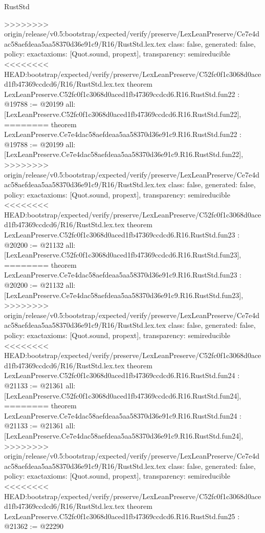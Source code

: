 \begin{lexlean}{RustStd}
\begin{coremodule}
{\begin{coremodule}
{{{{{{{{{{{{{{{{{{{{{{{{{>>>>>>>> origin/release/v0.5:bootstrap/expected/verify/preserve/LexLeanPreserve/Ce7e4dac58aefdeaa5aa58370d36e91c9/R16/RustStd.lex.tex
  class: false,
  generated: false,
  policy: exact{axioms: [Quot.sound, propext]},
  transparency: semireducible
}
<<<<<<<< HEAD:bootstrap/expected/verify/preserve/LexLeanPreserve/C52fc0f1c3068d0aced1fb47369ccdcd6/R16/RustStd.lex.tex
theorem LexLeanPreserve.C52fc0f1c3068d0aced1fb47369ccdcd6.R16.RustStd.fun22 : @19788 := @20199 {
  all: [LexLeanPreserve.C52fc0f1c3068d0aced1fb47369ccdcd6.R16.RustStd.fun22],
========
theorem LexLeanPreserve.Ce7e4dac58aefdeaa5aa58370d36e91c9.R16.RustStd.fun22 : @19788 := @20199 {
  all: [LexLeanPreserve.Ce7e4dac58aefdeaa5aa58370d36e91c9.R16.RustStd.fun22],
>>>>>>>> origin/release/v0.5:bootstrap/expected/verify/preserve/LexLeanPreserve/Ce7e4dac58aefdeaa5aa58370d36e91c9/R16/RustStd.lex.tex
  class: false,
  generated: false,
  policy: exact{axioms: [Quot.sound, propext]},
  transparency: semireducible
}
<<<<<<<< HEAD:bootstrap/expected/verify/preserve/LexLeanPreserve/C52fc0f1c3068d0aced1fb47369ccdcd6/R16/RustStd.lex.tex
theorem LexLeanPreserve.C52fc0f1c3068d0aced1fb47369ccdcd6.R16.RustStd.fun23 : @20200 := @21132 {
  all: [LexLeanPreserve.C52fc0f1c3068d0aced1fb47369ccdcd6.R16.RustStd.fun23],
========
theorem LexLeanPreserve.Ce7e4dac58aefdeaa5aa58370d36e91c9.R16.RustStd.fun23 : @20200 := @21132 {
  all: [LexLeanPreserve.Ce7e4dac58aefdeaa5aa58370d36e91c9.R16.RustStd.fun23],
>>>>>>>> origin/release/v0.5:bootstrap/expected/verify/preserve/LexLeanPreserve/Ce7e4dac58aefdeaa5aa58370d36e91c9/R16/RustStd.lex.tex
  class: false,
  generated: false,
  policy: exact{axioms: [Quot.sound, propext]},
  transparency: semireducible
}
<<<<<<<< HEAD:bootstrap/expected/verify/preserve/LexLeanPreserve/C52fc0f1c3068d0aced1fb47369ccdcd6/R16/RustStd.lex.tex
theorem LexLeanPreserve.C52fc0f1c3068d0aced1fb47369ccdcd6.R16.RustStd.fun24 : @21133 := @21361 {
  all: [LexLeanPreserve.C52fc0f1c3068d0aced1fb47369ccdcd6.R16.RustStd.fun24],
========
theorem LexLeanPreserve.Ce7e4dac58aefdeaa5aa58370d36e91c9.R16.RustStd.fun24 : @21133 := @21361 {
  all: [LexLeanPreserve.Ce7e4dac58aefdeaa5aa58370d36e91c9.R16.RustStd.fun24],
>>>>>>>> origin/release/v0.5:bootstrap/expected/verify/preserve/LexLeanPreserve/Ce7e4dac58aefdeaa5aa58370d36e91c9/R16/RustStd.lex.tex
  class: false,
  generated: false,
  policy: exact{axioms: [Quot.sound, propext]},
  transparency: semireducible
}
<<<<<<<< HEAD:bootstrap/expected/verify/preserve/LexLeanPreserve/C52fc0f1c3068d0aced1fb47369ccdcd6/R16/RustStd.lex.tex
theorem LexLeanPreserve.C52fc0f1c3068d0aced1fb47369ccdcd6.R16.RustStd.fun25 : @21362 := @22290 {
}}}}}}}}}}}}}}}}}}}}}}}}}}}}
\end{coremodule}}
\end{coremodule}
\end{lexlean}
